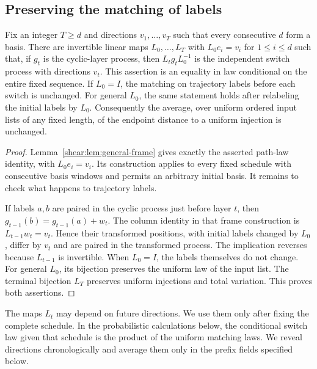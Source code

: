 \subsection{Preserving the matching of labels}
\label{frames:invariance-section}

\begin{lemma}
\label{frames:matching-invariance}
Fix an integer $T\ge d$ and directions $v_1,\ldots,v_T$ such that
every consecutive $d$ form a
basis. There are invertible linear maps $L_0,\ldots,L_T$ with
$L_0e_i=v_i$ for $1\le i\le d$ such that, if $g_t$ is the cyclic-layer
process, then $L_tg_tL_0^{-1}$ is the independent switch process with
directions $v_t$. This assertion is an equality in law conditional on
the entire fixed sequence. If $L_0=I$, the matching on trajectory labels
before each switch is unchanged. For general $L_0$, the same statement
holds after relabeling the initial labels by $L_0$. Consequently the
average, over uniform ordered input lists of any fixed length, of the
endpoint distance to a uniform injection is unchanged.
\end{lemma}

\begin{proof}
Lemma~\ref{shear:lem:general-frame} gives exactly the asserted path-law
identity, with $L_0e_i=v_i$. Its construction applies to every fixed
schedule with consecutive basis windows and permits an arbitrary
initial basis. It remains to check what happens to trajectory labels.

If labels $a,b$ are paired in the cyclic process just before layer $t$,
then $g_{t-1}(b)=g_{t-1}(a)+w_t$. The column identity in that frame
construction is $L_{t-1}w_t=v_t$. Hence their transformed positions,
with initial labels changed by $L_0$, differ by $v_t$ and are paired
in the transformed process. The implication reverses because
$L_{t-1}$ is invertible. When $L_0=I$, the labels themselves do not
change. For general $L_0$, its bijection preserves the uniform law
of the input list. The terminal bijection $L_T$ preserves uniform
injections and total variation. This proves both assertions.
\end{proof}

The maps $L_t$ may depend on future directions. We use them only after
fixing the complete schedule. In the probabilistic calculations below,
the conditional switch law given that schedule is the product of the
uniform matching laws. We reveal directions chronologically and average
them only in the prefix fields specified below.

